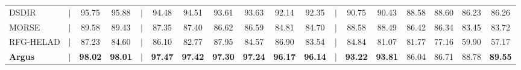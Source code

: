\documentclass{SCIS2026}
\begin{document}
\begin{table}[ht]
\begin{center}
\begin{threeparttable}
{\begin{tabular}{lccccccccccccccccc}
					DSDIR 
					& $|$ 
					& 95.75 & 95.88 
					& $|$ 
					& 94.48 & 94.51 
					& 93.61 & 93.63 
					& 92.14 & 92.35 
					& $|$ 
					& 90.75 & 90.43 
					& 88.58 & 88.60 
					& 86.23 & 86.26 \\
					
					MORSE 
					& $|$ 
					& 89.58 & 89.43 
					& $|$ 
					& 87.35 & 87.40 
					& 86.62 & 86.59 
					& 84.81 & 84.70 
					& $|$ 
					& 88.58 & 88.49 
					& 86.42 & 86.34 
					& 83.45 & 83.72 \\
					
					RFG-HELAD 
					& $|$ 
					& 87.23 & 84.60 
					& $|$ 
					& 86.10 & 82.77 
					& 87.95 & 84.57 
					& 86.90 & 83.54 
					& $|$ 
					& 84.84 & 81.07 
					& 81.77 & 77.16 
					& 59.90 & 57.17 \\
					\midrule
					
					\textbf{Argus} 
					& $|$ 
					& \textbf{98.02} & \textbf{98.01} 
					& $|$ 
					& \textbf{97.47} & \textbf{97.42} 
					& \textbf{97.30} & \textbf{97.24} 
					& \textbf{96.17} & \textbf{96.14} 
					& $|$ 
					& \textbf{93.22} & \textbf{93.81} 
					& 86.04 & 86.71 
					& 88.78 & \textbf{89.55} \\
					
					\bottomrule
				\end{tabular}
			}
		\end{threeparttable}
	\end{center}
	\vspace{-0.7cm}
\end{table}
\end{document}
